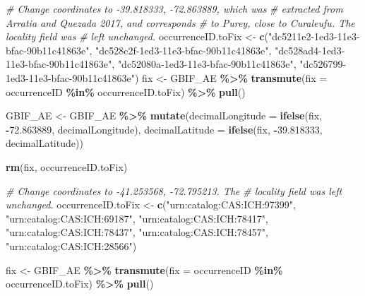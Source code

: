 \documentclass[sn-apa,pdflatex]{sn-jnl}
\newenvironment{Shaded}{\begin{snugshade}}{\end{snugshade}}
\newcommand{\AttributeTok}[1]{\textcolor[rgb]{0.13,0.29,0.53}{#1}}
\newcommand{\CommentTok}[1]{\textcolor[rgb]{0.56,0.35,0.01}{\textit{#1}}}
\newcommand{\FloatTok}[1]{\textcolor[rgb]{0.00,0.00,0.81}{#1}}
\newcommand{\FunctionTok}[1]{\textcolor[rgb]{0.13,0.29,0.53}{\textbf{#1}}}
\newcommand{\NormalTok}[1]{#1}
\newcommand{\OtherTok}[1]{\textcolor[rgb]{0.56,0.35,0.01}{#1}}
\newcommand{\SpecialCharTok}[1]{\textcolor[rgb]{0.81,0.36,0.00}{\textbf{#1}}}
\newcommand{\StringTok}[1]{\textcolor[rgb]{0.31,0.60,0.02}{#1}}
\begin{document}
\begin{Shaded}
\begin{Highlighting}[]
\CommentTok{\# Change coordinates to {-}39.818333, {-}72.863889, which was}
\CommentTok{\# extracted from Arratia and Quezada 2017, and corresponds}
\CommentTok{\# to Purey, close to Curaleufu. The \textquotesingle{}locality\textquotesingle{} field was}
\CommentTok{\# left unchanged.}
\NormalTok{occurrenceID.toFix }\OtherTok{\textless{}{-}} \FunctionTok{c}\NormalTok{(}\StringTok{"dc5211e2{-}1ed3{-}11e3{-}bfac{-}90b11c41863e"}\NormalTok{,}
    \StringTok{"dc528c2f{-}1ed3{-}11e3{-}bfac{-}90b11c41863e"}\NormalTok{, }\StringTok{"dc528ad4{-}1ed3{-}11e3{-}bfac{-}90b11c41863e"}\NormalTok{,}
    \StringTok{"dc52080a{-}1ed3{-}11e3{-}bfac{-}90b11c41863e"}\NormalTok{, }\StringTok{"dc526799{-}1ed3{-}11e3{-}bfac{-}90b11c41863e"}\NormalTok{)}
\NormalTok{fix }\OtherTok{\textless{}{-}}\NormalTok{ GBIF\_AE }\SpecialCharTok{\%\textgreater{}\%}
    \FunctionTok{transmute}\NormalTok{(}\AttributeTok{fix =}\NormalTok{ occurrenceID }\SpecialCharTok{\%in\%}\NormalTok{ occurrenceID.toFix) }\SpecialCharTok{\%\textgreater{}\%}
    \FunctionTok{pull}\NormalTok{()}

\NormalTok{GBIF\_AE }\OtherTok{\textless{}{-}}\NormalTok{ GBIF\_AE }\SpecialCharTok{\%\textgreater{}\%}
    \FunctionTok{mutate}\NormalTok{(}\AttributeTok{decimalLongitude =} \FunctionTok{ifelse}\NormalTok{(fix, }\SpecialCharTok{{-}}\FloatTok{72.863889}\NormalTok{, decimalLongitude),}
        \AttributeTok{decimalLatitude =} \FunctionTok{ifelse}\NormalTok{(fix, }\SpecialCharTok{{-}}\FloatTok{39.818333}\NormalTok{, decimalLatitude))}

\FunctionTok{rm}\NormalTok{(fix, occurrenceID.toFix)}

\CommentTok{\# Change coordinates to {-}41.253568, {-}72.795213. The}
\CommentTok{\# \textquotesingle{}locality\textquotesingle{} field was left unchanged.}
\NormalTok{occurrenceID.toFix }\OtherTok{\textless{}{-}} \FunctionTok{c}\NormalTok{(}\StringTok{"urn:catalog:CAS:ICH:97399"}\NormalTok{, }\StringTok{"urn:catalog:CAS:ICH:69187"}\NormalTok{,}
    \StringTok{"urn:catalog:CAS:ICH:78417"}\NormalTok{, }\StringTok{"urn:catalog:CAS:ICH:78437"}\NormalTok{,}
    \StringTok{"urn:catalog:CAS:ICH:78457"}\NormalTok{, }\StringTok{"urn:catalog:CAS:ICH:28566"}\NormalTok{)}

\NormalTok{fix }\OtherTok{\textless{}{-}}\NormalTok{ GBIF\_AE }\SpecialCharTok{\%\textgreater{}\%}
    \FunctionTok{transmute}\NormalTok{(}\AttributeTok{fix =}\NormalTok{ occurrenceID }\SpecialCharTok{\%in\%}\NormalTok{ occurrenceID.toFix) }\SpecialCharTok{\%\textgreater{}\%}
    \FunctionTok{pull}\NormalTok{()}


\end{Highlighting}
\end{Shaded}
\end{document}
